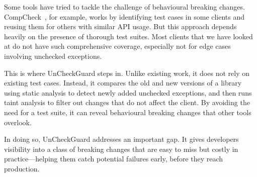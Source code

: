 Some tools have tried to tackle the challenge of behavioural breaking changes. CompCheck~\cite{CompCheck}, for example, works by identifying test cases in some clients and reusing them for others with similar API usage. But this approach depends heavily on the presence of thorough test suites. Most clients that we have looked at do not have such comprehensive coverage, especially not for edge cases involving unchecked exceptions.

This is where UnCheckGuard steps in. Unlike existing work, it does not rely on existing test cases. Instead, it compares the old and new versions of a library using static analysis to detect newly added unchecked exceptions, and then runs taint analysis to filter out changes that do not affect the client. By avoiding the need for a test suite, it can reveal behavioural breaking changes that other tools overlook.

In doing so, UnCheckGuard addresses an important gap. It gives developers visibility into a class of breaking changes that are easy to miss but costly in practice—helping them catch potential failures early, before they reach production.
